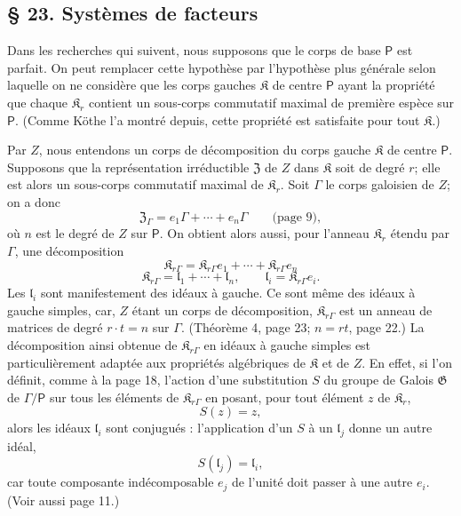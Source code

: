 \subsection*{\S{} 23. Systèmes de facteurs}\label{fr-r823-systemes-facteurs}

Dans les recherches qui suivent, nous supposons que le corps de base \(\mathsf P\) est parfait. On peut remplacer cette hypothèse par l'hypothèse plus générale selon laquelle on ne considère que les corps gauches \(\mathfrak K\) de centre \(\mathsf P\) ayant la propriété que chaque \(\mathfrak K_r\) contient un sous-corps commutatif maximal de première espèce sur \(\mathsf P\). (Comme Köthe l'a montré depuis, cette propriété est satisfaite pour tout \(\mathfrak K\).)

Par \(Z\), nous entendons un corps de décomposition du corps gauche \(\mathfrak K\) de centre \(\mathsf P\). Supposons que la représentation irréductible \(\mathfrak Z\) de \(Z\) dans \(\mathfrak K\) soit de degré \(r\); elle est alors un sous-corps commutatif maximal de \(\mathfrak K_r\). Soit \(\Gamma\) le corps galoisien de \(Z\); on a donc
\[
\mathfrak Z_\Gamma=e_1\Gamma+\cdots+e_n\Gamma
\qquad\text{(page 9)},
\]
où \(n\) est le degré de \(Z\) sur \(\mathsf P\). On obtient alors aussi, pour l'anneau \(\mathfrak K_r\) étendu par \(\Gamma\), une décomposition
\[
\mathfrak K_{r\Gamma}=\mathfrak K_{r\Gamma}e_1+\cdots+\mathfrak K_{r\Gamma}e_n
\]
\[
\mathfrak K_{r\Gamma}=\mathfrak l_1+\cdots+\mathfrak l_n,\qquad
\mathfrak l_i=\mathfrak K_{r\Gamma}e_i.
\]
Les \(\mathfrak l_i\) sont manifestement des idéaux à gauche. Ce sont même des idéaux à gauche simples, car, \(Z\) étant un corps de décomposition, \(\mathfrak K_{r\Gamma}\) est un anneau de matrices de degré \(r\cdot t=n\) sur \(\Gamma\). (Théorème 4, page 23; \(n=rt\), page 22.) La décomposition ainsi obtenue de \(\mathfrak K_{r\Gamma}\) en idéaux à gauche simples est particulièrement adaptée aux propriétés algébriques de \(\mathfrak K\) et de \(Z\). En effet, si l'on définit, comme à la page 18, l'action d'une substitution \(S\) du groupe de Galois \(\mathfrak G\) de \(\Gamma/\mathsf P\) sur tous les éléments de \(\mathfrak K_{r\Gamma}\) en posant, pour tout élément \(z\) de \(\mathfrak K_r\),
\[
S(z)=z,
\]
alors les idéaux \(\mathfrak l_i\) sont conjugués : l'application d'un \(S\) à un \(\mathfrak l_j\) donne un autre idéal,
\[
S(\mathfrak l_j)=\mathfrak l_i,
\]
car toute composante indécomposable \(e_j\) de l'unité doit passer à une autre \(e_i\). (Voir aussi page 11.)

